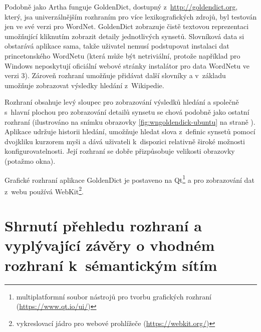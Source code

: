 \documentclass[a4paper, 11pt, oneside, showtrims]{book}
\begin{document}
				Podobně jako Artha funguje GoldenDict, dostupný z~\url{http://goldendict.org}, který, jsa univerzálnějším rozhraním pro více lexikografických zdrojů, byl testován jen ve své verzi pro WordNet. GoldenDict zobrazuje čistě textovou reprezentaci umožňující kliknutím zobrazit detaily jednotlivých synsetů. Slovníková data si obstarává aplikace sama, takže uživatel nemusí podstupovat instalaci dat princetonského WordNetu (která může být netriviální, protože například pro Windows neposkytují oficiální webové stránky instalátor pro data WordNetu ve verzi 3). Zároveň rozhraní umožňuje přidávat další slovníky a v~základu umožňuje zobrazovat výsledky hledání z~Wikipedie. 

				Rozhraní obsahuje levý sloupec pro zobrazování výsledků hledání a společně s~hlavní plochou pro zobrazování detailů synsetu se chová podobně jako ostatní rozhraní (ilustrováno na snímku obrazovky \ref{fig:wngoldendick-ubuntu} na straně \pageref{fig:wngoldendick-ubuntu}). Aplikace udržuje historii hledání, umožňuje hledat slova z~definic synsetů pomocí dvojkliku kurzorem myši a dává uživateli k~dispozici relativně široké možnosti konfigurovatelnosti. Její rozhraní se dobře přizpůsobuje velikosti obrazovky (potažmo okna).

				Grafické rozhraní aplikace GoldenDict je postaveno na Qt\footnote{multiplatformní soubor nástrojů pro tvorbu grafických rozhraní (\url{https://www.qt.io/ui/})} a pro zobrazování dat z~webu používá WebKit\footnote{vykreslovací jádro pro webové prohlížeče (\url{https://webkit.org/})}. \parencite{goldendict2016}


		\chapter{Shrnutí přehledu rozhraní a vyplývající závěry o vhodném rozhraní k~sémantickým sítím}
		\label{cha:shrnuti-prehledu}

\end{document}
